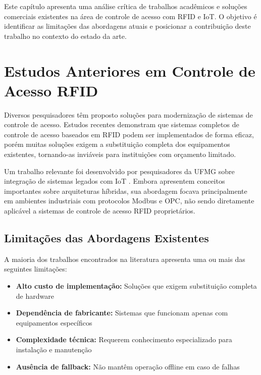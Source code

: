 
\label{Cap:TrabalhosRelacionados}

Este capítulo apresenta uma análise crítica de trabalhos acadêmicos e soluções comerciais existentes na área de controle de acesso com RFID e IoT. O objetivo é identificar as limitações das abordagens atuais e posicionar a contribuição deste trabalho no contexto do estado da arte.

\section{Estudos Anteriores em Controle de Acesso RFID}
\label{Sec:EstudosAnteriores}

Diversos pesquisadores têm proposto soluções para modernização de sistemas de controle de acesso. Estudos recentes demonstram que sistemas completos de controle de acesso baseados em RFID podem ser implementados de forma eficaz, porém muitas soluções exigem a substituição completa dos equipamentos existentes, tornando-as inviáveis para instituições com orçamento limitado.

Um trabalho relevante foi desenvolvido por pesquisadores da UFMG sobre integração de sistemas legados com IoT \cite{santos-iot-2016}. Embora apresentem conceitos importantes sobre arquiteturas híbridas, sua abordagem focava principalmente em ambientes industriais com protocolos Modbus e OPC, não sendo diretamente aplicável a sistemas de controle de acesso RFID proprietários.

\subsection{Limitações das Abordagens Existentes}

A maioria dos trabalhos encontrados na literatura apresenta uma ou mais das seguintes limitações:

\begin{itemize}
\item \textbf{Alto custo de implementação:} Soluções que exigem substituição completa de hardware
\item \textbf{Dependência de fabricante:} Sistemas que funcionam apenas com equipamentos específicos
\item \textbf{Complexidade técnica:} Requerem conhecimento especializado para instalação e manutenção
\item \textbf{Ausência de fallback:} Não mantêm operação offline em caso de falhas
\end{itemize}

